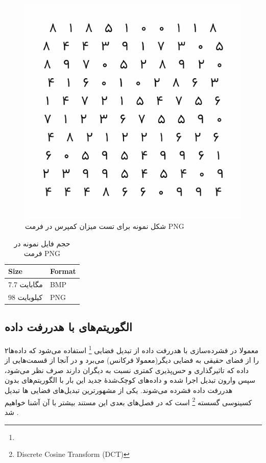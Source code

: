 \begin{figure}
	\centering
	\includegraphics[scale=0.6]{figs/compressed.png}
	\caption[شکل نمونه برای تست میزان کمپرس در فرمت PNG ]{شکل نمونه برای تست میزان کمپرس در فرمت PNG \cite{my_picture}}
	\label{example_1}
\end{figure}

\begin{table}
	\centering
	\caption{حجم فایل نمونه در فرمت PNG }
	\label{compare_1}
	\begin{tabular}{@{}ll@{}}
	\toprule
	Size & Format \\ \midrule
	7.7 مگابایت & BMP \\
	98 کیلوبایت & PNG \\ \bottomrule
	\end{tabular}
	\end{table}



\subsection{الگوریتم‌های با هدررفت داده}

۲معمولا در فشرده‌سازی با هدررفت داده از تبدیل‌‌ فضایی 
\footnote{}
استفاده می‌شود که داده‌ها را از فضای حقیقی به فضایی دیگر(معمولا فرکانس) می‌برد و در آنجا از قسمت‌هایی از داده که تاثیرگذاری و حس‌پذیری کمتری
نسبت به دیگران دارند صرف نظر می‌شود، سپس وارون تبدیل اجرا شده و داده‌های کوچک‌شدهٔ جدید این بار با الگوریتم‌های 
بدون هدررفت داده فشرده می‌شوند. یکی از 
مشهورترین
تبدیل‌های فضایی
ها تبدیل کسینوسی گسسته
\footnote{Discrete Cosine Transform (DCT)}
است که در فصل‌های بعدی این مستند بیشتر با آن آشنا خواهیم شد
\cite{dct}.
